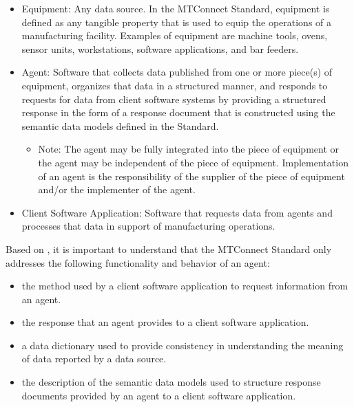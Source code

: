 \begin{itemize}
    \item Equipment:  Any data source.  In the MTConnect Standard, equipment is defined as any tangible property that is used to equip the operations of a manufacturing facility.  Examples of equipment are machine tools, ovens, sensor units, workstations, software applications, and bar feeders.

    \item Agent:  Software that collects data published from one or more piece(s) of equipment, organizes that data in a structured manner, and responds to requests for data from client software systems by providing a structured response in the form of a \gls{response document} that is constructed using the \glspl{semantic data model} defined in the Standard. 

    \begin{itemize}
        \item Note: The \gls{agent} may be fully integrated into the piece of equipment or the \gls{agent} may be independent of the piece of equipment.  Implementation of an \gls{agent} is the responsibility of the supplier of the piece of equipment and/or the implementer of the \gls{agent}.
    \end{itemize}

    \item Client Software Application:  Software that requests data from \glspl{agent} and processes that data in support of manufacturing operations. 

\end{itemize}

Based on , it is important to understand that the MTConnect Standard only addresses the following functionality and behavior of an \gls{agent}:


\begin{itemize}
    \item the method used by a client software application to request information from an \gls{agent}.

    \item the response that an \gls{agent} provides to a client software application.

    \item a \gls{data dictionary} used to provide consistency in understanding the meaning of data reported by a data source.

    \item the description of the \glspl{semantic data model} used to structure \glspl{response document} provided by an \gls{agent} to a client software application.

\end{itemize}

